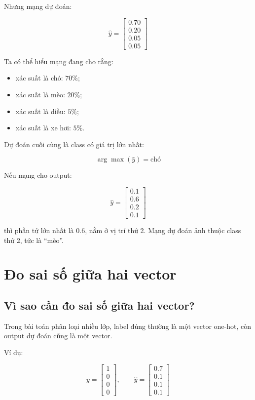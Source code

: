 \documentclass[12pt,a4paper]{report}
\begin{document}
Nhưng mạng dự đoán:

\[
    \hat{y} =
    \begin{bmatrix}
    0.70\\
    0.20\\
    0.05\\
    0.05
    \end{bmatrix}
\]

Ta có thể hiểu mạng đang cho rằng:

\begin{itemize}
    \item xác suất là chó: $70\%$;
    \item xác suất là mèo: $20\%$;
    \item xác suất là diều: $5\%$;
    \item xác suất là xe hơi: $5\%$.
\end{itemize}

Dự đoán cuối cùng là class có giá trị lớn nhất:

\[
    \arg\max(\hat{y}) = \text{chó}
\]

\begin{vidu}
Nếu mạng cho output:

\[
    \hat{y} =
    \begin{bmatrix}
    0.1\\
    0.6\\
    0.2\\
    0.1
    \end{bmatrix}
\]

thì phần tử lớn nhất là $0.6$, nằm ở vị trí thứ 2. Mạng dự đoán ảnh thuộc class thứ 2, tức là ``mèo''.
\end{vidu}

\chapter{Đo sai số giữa hai vector}

\section{Vì sao cần đo sai số giữa hai vector?}

Trong bài toán phân loại nhiều lớp, label đúng thường là một vector one-hot, còn output dự đoán cũng là một vector.

Ví dụ:

\[
    y =
    \begin{bmatrix}
    1\\0\\0\\0
    \end{bmatrix},
    \qquad
    \hat{y} =
    \begin{bmatrix}
    0.7\\
    0.1\\
    0.1\\
    0.1
    \end{bmatrix}
\]
\end{document}
